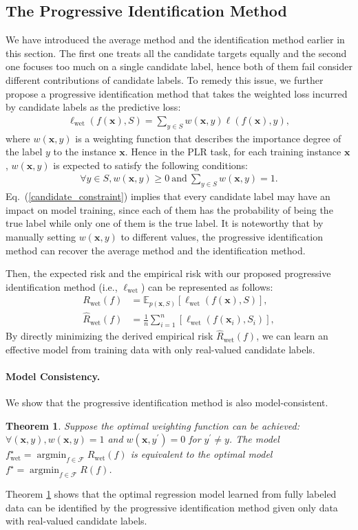 \documentclass[letterpaper]{article} %
\newtheorem{thm}{Theorem}
\newcommand{\argmin}{\mathop{\arg\min}}
\begin{document}
\subsection{The Progressive Identification Method}
We have introduced the average method and the identification method earlier in this section. The first one treats all the candidate targets equally and the second one focuses too much on a single candidate label, hence both of them fail consider different contributions of candidate labels. To remedy this issue, we further propose a progressive identification method that takes the weighted loss incurred by candidate labels as the predictive loss:
\begin{gather}
\nonumber
\ell_{\mathrm{wet}}(f(\bm{x}), S) = \sum\nolimits_{y\in S}w(\bm{x},y)\ell(f(\bm{x}),y),
\end{gather}
where $w(\bm{x},y)$ is a weighting function that describes the importance degree of the label $y$ to the instance $\bm{x}$. Hence in the PLR task, for each training instance $\bm{x}$, $w(\bm{x},y)$ is expected to satisfy the following conditions:
\begin{gather}
\label{candidate_constraint}
\forall y\in S, w(\bm{x},{y})\geq 0\ \mathrm{and}\
\sum\nolimits_{y\in S} w(\bm{x},y)=1.
\end{gather}
Eq.~(\ref{candidate_constraint}) implies that every candidate label may have an impact on model training, since each of them has the probability of being the true label while only one of them is the true label. It is noteworthy that by manually setting $w(\bm{x},y)$ to different values, the progressive identification method can recover the average method and the identification method.

Then, the expected risk and the empirical risk with our proposed progressive identification method (i.e., $\ell_{\mathrm{wet}}$) can be represented as follows:
\begin{align}
\nonumber
R_{\mathrm{wet}}(f)&=\mathbb{E}_{p(\bm{x}, S)}[\ell_{\mathrm{wet}}(f(\bm{x}),S)],\\
\label{weighting_empirical_risk}
\widehat{R}_{\mathrm{wet}}(f)&=\frac{1}{n}\sum\nolimits_{i=1}^n[\ell_{\mathrm{wet}}(f(\bm{x}_i),S_i)],
\end{align}
By directly minimizing the derived empirical risk $\widehat{R}_{\mathrm{wet}}(f)$, we can learn an effective model from training data with only real-valued candidate labels.
\paragraph{Model Consistency.} We show that the progressive identification method is also model-consistent.
\begin{thm}
\label{thm3}
Suppose the optimal weighting function can be achieved: $\forall (\bm{x},y), w(\bm{x},y)=1$ and $w(\bm{x},y^\prime)= 0$ for $y^\prime\neq y$.
The model $f^\star_{\mathrm{wet}}=\argmin_{f\in\mathcal{F}}R_{\mathrm{wet}}(f)$ is equivalent to the optimal model $f^\star = \argmin_{f\in\mathcal{F}}{R}(f)$.
\end{thm}
Theorem \ref{thm3} shows that the optimal regression model learned from fully labeled data can be identified by the progressive identification method given only data with real-valued candidate labels.
\end{document}
